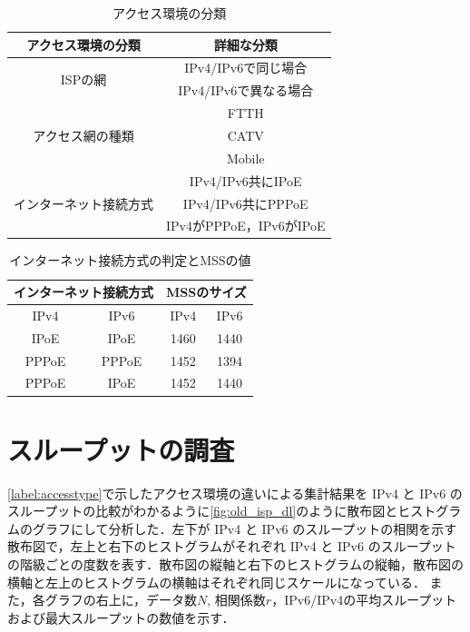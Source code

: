 \begin{table}[htbp]
    \caption{アクセス環境の分類}
    \label{tab:accesstype}
    \begin{center}
        \begin{tabular}{c|c} \hline
            アクセス環境の分類 & 詳細な分類 \\ \hline \hline
            \multirow{2}{*}{ISPの網} & IPv4/IPv6で同じ場合 \\
            & IPv4/IPv6で異なる場合 \\
            \hline
            \multirow{3}{*}{アクセス網の種類} & FTTH \\ 
            & CATV \\
            & Mobile \\
            \hline
            \multirow{3}{*}{インターネット接続方式} & IPv4/IPv6共にIPoE \\
            & IPv4/IPv6共にPPPoE \\
            & IPv4がPPPoE，IPv6がIPoE \\ \hline
        \end{tabular}
    \end{center}
\end{table}
\FloatBarrier
\begin{table}[htbp]
    \caption{インターネット接続方式の判定とMSSの値}
    \label{tab:mss}
    \begin{center}
        \begin{tabular}{cc|cc} \hline
            \multicolumn{2}{c|}{インターネット接続方式}& \multicolumn{2}{c}{MSSのサイズ} \\ \hline
            IPv4& IPv6& IPv4& IPv6 \\ \hline \hline
            IPoE & IPoE & 1460 & 1440 \\
            PPPoE & PPPoE & 1452 & 1394 \\
            PPPoE & IPoE & 1452 & 1440 \\ \hline
        \end{tabular}
    \end{center}
\end{table}
\FloatBarrier

\section{スループットの調査}
\label{sec:throughput}
\cref{label:accesstype}で示したアクセス環境の違いによる集計結果を IPv4 と IPv6 のスループットの比較がわかるように\cref{fig:old_isp_dl}のように散布図とヒストグラムのグラフにして分析した．左下が IPv4 と IPv6 のスループットの相関を示す散布図で，左上と右下のヒストグラムがそれぞれ IPv4 と IPv6 のスループットの階級ごとの度数を表す．散布図の縦軸と右下のヒストグラムの縦軸，散布図の横軸と左上のヒストグラムの横軸はそれぞれ同じスケールになっている．
また，各グラフの右上に，データ数$N$, 相関係数$r$，IPv6/IPv4の平均スループットおよび最大スループットの数値を示す．


